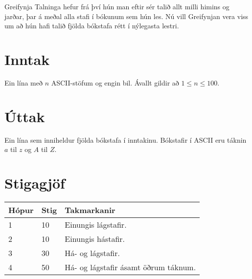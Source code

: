 
Greifynja Talninga hefur frá því hún man eftir sér talið allt milli himins og jarðar, 
þar á meðal alla stafi í bókunum sem hún les. 
Nú vill Greifynjan vera viss um að hún hafi talið fjölda bókstafa rétt í nýlegasta lestri.

\section*{Inntak}
Ein lína með $n$ ASCII-stöfum og engin bil.
Ávallt gildir að $1 \leq n \leq 100$.

\section*{Úttak}
Ein lína sem inniheldur fjölda bókstafa í inntakinu.
Bókstafir í ASCII eru táknin $a$ til $z$ og $A$ til $Z$.

\section*{Stigagjöf}
\begin{tabular}{|l|l|l|} \hline
Hópur & Stig & Takmarkanir \\ \hline
1     & 10   & Einungis lágstafir. \\ \hline
2     & 10   & Einungis hástafir. \\ \hline
3     & 30   & Há- og lágstafir. \\ \hline
4     & 50   & Há- og lágstafir ásamt öðrum táknum. \\ \hline
\end{tabular}
